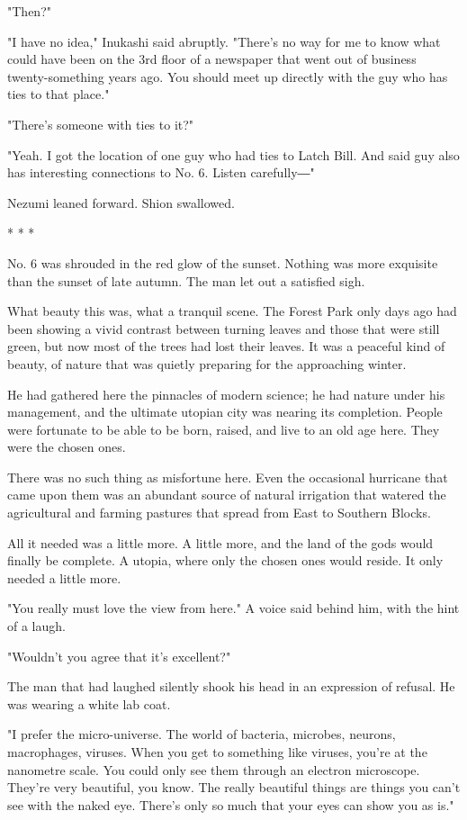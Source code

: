 "Then?"

"I have no idea," Inukashi said abruptly. "There's no way for me to know
what could have been on the 3rd floor of a newspaper that went out of
business twenty-something years ago. You should meet up directly with
the guy who has ties to that place."

"There's someone with ties to it?"

"Yeah. I got the location of one guy who had ties to Latch Bill. And
said guy also has interesting connections to No. 6. Listen carefully―"

Nezumi leaned forward. Shion swallowed.

* * *

No. 6 was shrouded in the red glow of the sunset. Nothing was more
exquisite than the sunset of late autumn. The man let out a satisfied
sigh.

What beauty this was, what a tranquil scene. The Forest Park only days
ago had been showing a vivid contrast between turning leaves and those
that were still green, but now most of the trees had lost their leaves.
It was a peaceful kind of beauty, of nature that was quietly preparing
for the approaching winter.

He had gathered here the pinnacles of modern science; he had nature
under his management, and the ultimate utopian city was nearing its
completion. People were fortunate to be able to be born, raised, and
live to an old age here. They were the chosen ones.

There was no such thing as misfortune here. Even the occasional
hurricane that came upon them was an abundant source of natural
irrigation that watered the agricultural and farming pastures that
spread from East to Southern Blocks.

All it needed was a little more. A little more, and the land of the gods
would finally be complete. A utopia, where only the chosen ones would
reside. It only needed a little more.

"You really must love the view from here." A voice said behind him, with
the hint of a laugh.

"Wouldn't you agree that it's excellent?"

The man that had laughed silently shook his head in an expression of
refusal. He was wearing a white lab coat.

"I prefer the micro-universe. The world of bacteria, microbes, neurons,
macrophages, viruses. When you get to something like viruses, you're at
the nanometre scale. You could only see them through an electron
microscope. They're very beautiful, you know. The really beautiful
things are things you can't see with the naked eye. There's only so much
that your eyes can show you as is."

